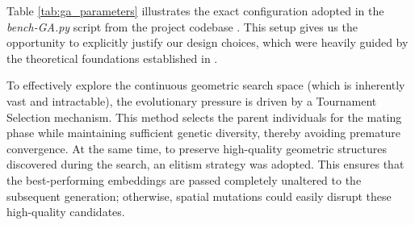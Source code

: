 \begin{table}[htbp]
    \centering
    \renewcommand{\arraystretch}{1.3}
    \caption{Hyperparameter baseline configuration for the Genetic Algorithm setup for a 5x5 instance (N=5 nodes).}
    \label{tab:ga_parameters}
\end{table}

Table \ref{tab:ga_parameters} illustrates the exact configuration adopted in the \textit{bench-GA.py} script from the project codebase \cite{orsucci_qubo_ga_quantum}. This setup gives us the opportunity to explicitly justify our design choices, which were heavily guided by the theoretical foundations established in \cite{bookGA}.

To effectively explore the continuous geometric search space (which is inherently vast and intractable), the evolutionary pressure is driven by a Tournament Selection mechanism. This method selects the parent individuals for the mating phase while maintaining sufficient genetic diversity, thereby avoiding premature convergence. At the same time, to preserve high-quality geometric structures discovered during the search, an elitism strategy was adopted. This ensures that the best-performing embeddings are passed completely unaltered to the subsequent generation; otherwise, spatial mutations could easily disrupt these high-quality candidates.

